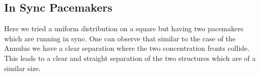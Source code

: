 \begin{minipage}{0.45\textwidth}
\subsection{In Sync Pacemakers}
Here we tried a uniform distribution on a square but having two pacemakers which are running in sync.
One can observe that similar to the case of the Annulus we have a clear separation where the two concentration fronts collide.
This leads to a clear and straight separation of the two structures which are of a similar size.
\end{minipage}